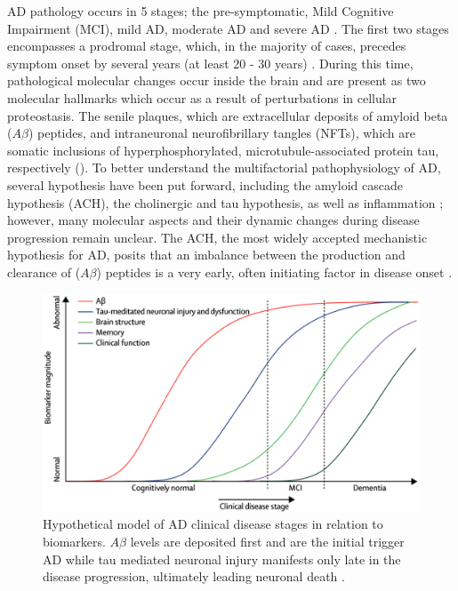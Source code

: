 AD pathology occurs in 5 stages; the pre-symptomatic, Mild Cognitive Impairment (MCI), mild AD, moderate AD and severe AD \citep{Caldwell2015}. The first two stages encompasses a prodromal stage, which, in the majority of cases, precedes symptom onset by several years (at least 20 - 30 years) \citep{Caldwell2015,Caselli2013,Penn1993}. During this time, pathological molecular changes occur inside the brain and are present as two molecular hallmarks which occur as a result of perturbations in cellular proteostasis. The senile plaques, which are extracellular deposits of amyloid beta ($A\beta$)
peptides, and intraneuronal neurofibrillary tangles (NFTs), which are somatic inclusions of hyperphosphorylated, microtubule-associated protein tau, respectively \citep{Mattson2008} (). To better understand the multifactorial pathophysiology of AD, several hypothesis have been put forward, including the amyloid cascade hypothesis (ACH), the cholinergic and tau hypothesis, as well as inflammation \citep{Kurz2011}; however, many molecular aspects and their dynamic changes during disease progression remain unclear. The ACH, the most widely accepted mechanistic hypothesis for AD, posits that an imbalance between the production and clearance of ($A\beta$) peptides is a very early, often initiating factor in disease onset \citep{Hardy2009,Hardy1992}.

\begin{figure}[!htbp]
  \includegraphics[width=\linewidth]{figures/10_ad_model}
  \caption{Hypothetical model of AD clinical disease stages in relation to biomarkers.  $A\beta$ levels are deposited first and are the initial trigger AD while tau mediated neuronal injury manifests only late in the disease progression, ultimately leading neuronal death \citep{Petrella2013} .}
  \label{fig:10_ad_model}
\end{figure}

